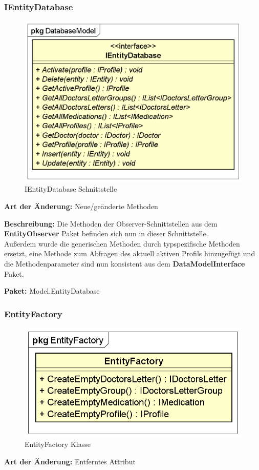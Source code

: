 \documentclass[a4paper]{scrreprt}
\begin{document}
\subsubsection{IEntityDatabase}
\begin{figure}[H]
\centering
\includegraphics[width=0.75\textheight]{graphics/Klassendiagramme/Model/IEntityDatabase.png}
\caption{IEntityDatabase Schnittstelle}
\end{figure}
\textbf{Art der Änderung:} Neue/geänderte Methoden

\textbf{Beschreibung:} Die Methoden der Observer-Schnittstellen aus dem \textbf{EntityObserver} Paket befinden sich nun in dieser Schnittstelle. \\
Außerdem wurde die generischen Methoden durch typspezifische Methoden ersetzt, eine Methode zum Abfragen des aktuell aktiven Profils hinzugefügt und die Methodenparameter sind nun konsistent aus dem \textbf{DataModelInterface} Paket.

\textbf{Paket:} Model.EntityDatabase

\subsubsection{EntityFactory}
\begin{figure}[H]
\centering
\includegraphics[width=0.75\textheight]{graphics/Klassendiagramme/Model/EntityFactory.png}
\caption{EntityFactory Klasse}
\end{figure}
\textbf{Art der Änderung:} Entferntes Attribut
\end{document}
